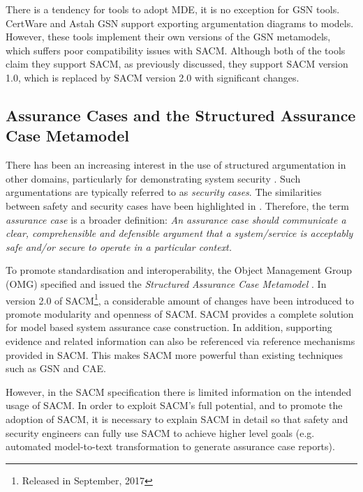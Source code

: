 There is a tendency for tools to adopt MDE, it is no exception for GSN tools. 
CertWare \cite{barry2011certware} and Astah GSN \cite{larrucea2017supporting} support exporting argumentation diagrams to models. 
However, these tools implement their own versions of the GSN metamodels, which suffers poor compatibility issues with SACM. 
Although both of the tools claim they support SACM, as previously discussed, they support SACM version 1.0, which is replaced by SACM version 2.0 with significant changes.

\subsection{Assurance Cases and the Structured Assurance Case Metamodel}
There has been an increasing interest in the use of structured argumentation in other domains, particularly for demonstrating system security \cite{bloomfield2010safety}. 
Such argumentations are typically referred to as \textit{security cases}. 
The similarities between safety and security cases have been highlighted in \cite{lautieri2005safsec}. 
Therefore, the term \textit{assurance case} is a broader definition: \textit{An assurance case should communicate a clear, comprehensible and defensible argument that a system/service is acceptably safe and/or secure to operate in a particular context.} 

To promote standardisation and interoperability, the Object Management Group (OMG) specified and issued the \textit{Structured Assurance Case Metamodel} \cite{sacm}. 
In version 2.0 of SACM\footnote{Released in September, 2017}, a considerable amount of changes have been introduced to promote modularity and openness of SACM. 
SACM provides a complete solution for model based system assurance case construction. 
In addition, supporting evidence and related information can also be referenced via reference mechanisms provided in SACM. 
This makes SACM more powerful than existing techniques such as GSN and CAE.

However, in the SACM specification there is limited information on the intended usage of SACM. 
In order to exploit SACM's full potential, and to promote the adoption of SACM, it is necessary to explain SACM in detail so that safety and security engineers can fully use SACM to achieve higher level goals (e.g. automated model-to-text transformation to generate assurance case reports). 

